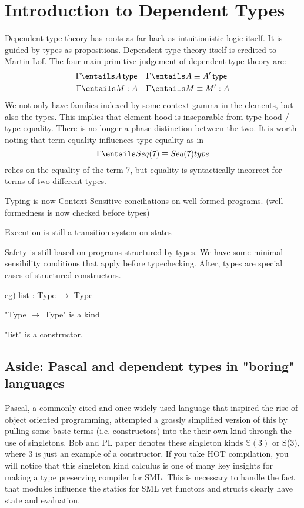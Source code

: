 \documentclass[11pt]{article}
\begin{document}
\section*{Introduction to Dependent Types}

Dependent type theory has roots as far back as intuitionistic logic itself. It is guided by types as propositions. Dependent type theory itself is credited to Martin-Lof. The four main primitive judgement of dependent type theory are:
\begin{align*}
    \Gamma \entails \isTp{A} \quad & \Gamma \entails \eqTp{A}{A'} \\
    \Gamma \entails M : A \quad & \Gamma \entails M \equiv M' : A \\
\end{align*}
We not only have families indexed by some context gamma in the elements, but also the types. This implies that element-hood is inseparable from type-hood / type equality. There is no longer a phase distinction between the two. It is worth noting that term equality influences type equality as in
$$\Gamma \entails Seq(7) \equiv Seq(7) type$$
relies on the equality of the term 7, but equality is syntactically incorrect for terms of two different types.

Typing is now Context Sensitive conciliations on well-formed programs. (well-formedness is now checked before types)

Execution is still a transition system on states

Safety is still based on programs structured by types. We have some minimal sensibility conditions that apply before typechecking. After, types are special cases of structured constructors.

eg) list : Type $\rightarrow$ Type

"Type $\rightarrow$ Type" is a kind

"list" is a constructor.

\subsection*{Aside: Pascal and dependent types in "boring" languages}

Pascal, a commonly cited and once widely used language that inspired the rise of object oriented programming, attempted a grossly simplified version of this by pulling some basic terms (i.e. constructors) into the their own kind through the use of singletons. Bob and PL paper denotes these singleton kinds $\mathbb{S}(3)$ or S(3), where 3 is just an example of a constructor. If you take HOT compilation, you will notice that this singleton kind calculus is one of many key insights for making a type preserving compiler for SML. This is necessary to handle the fact that modules influence the statics for SML yet functors and structs clearly have state and evaluation.
\end{document}
